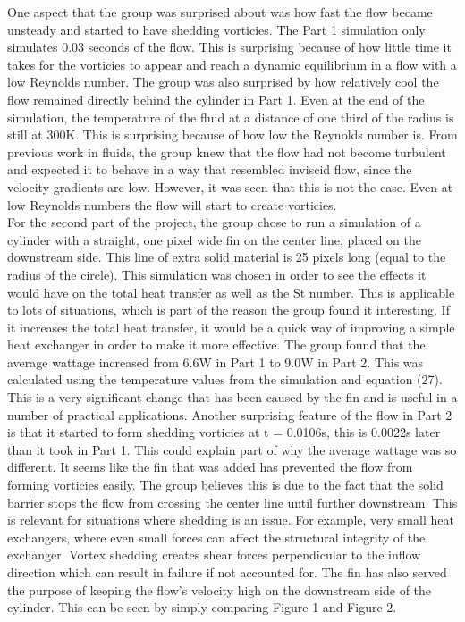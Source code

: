 One aspect that the group was surprised about was how fast the flow became unsteady and started to have shedding vorticies. The Part 1 simulation only simulates 0.03 seconds of the flow. This is surprising because of how little time it takes for the vorticies to appear and reach a dynamic equilibrium in a flow with a low Reynolds number. The group was also surprised by how relatively cool the flow remained directly behind the cylinder in Part 1. Even at the end of the simulation, the temperature of the fluid at a distance of one third of the radius is still at 300K. This is surprising because of how low the Reynolds number is. From previous work in fluids, the group knew that the flow had not become turbulent and expected it to behave in a way that resembled inviscid flow, since the velocity gradients are low. However, it was seen that this is not the case. Even at low Reynolds numbers the flow will start to create vorticies. \\ 


For the second part of the project, the group chose to run a simulation of a cylinder with a straight, one pixel wide fin on the center line, placed on the downstream side. This line of extra solid material is 25 pixels long (equal to the radius of the circle). This simulation was chosen in order to see the effects it would have on the total heat transfer as well as the St number. This is applicable to lots of situations, which is part of the reason the group found it interesting. If it increases the total heat transfer, it would be a quick way of improving a simple heat exchanger in order to make it more effective. The group found that the average wattage increased from 6.6W in Part 1 to 9.0W in Part 2. This was calculated using the temperature values from the simulation and equation (27). This is a very significant change that has been caused by the fin and is useful in a number of practical applications. Another surprising feature of the flow in Part 2 is that it started to form shedding vorticies at t = 0.0106s, this is 0.0022s later than it took in Part 1. This could explain part of why the average wattage was so different. It seems like the fin that was added has prevented the flow from forming vorticies easily. The group believes this is due to the fact that the solid barrier stops the flow from crossing the center line until further downstream. This is relevant for situations where shedding is an issue. For example, very small heat exchangers, where even small forces can affect the structural integrity of the exchanger. Vortex shedding creates shear forces perpendicular to the inflow direction which can result in failure if not accounted for. The fin has also served the purpose of keeping the flow's velocity high on the downstream side of the cylinder. This can be seen by simply comparing Figure 1 and Figure 2. \\ 

